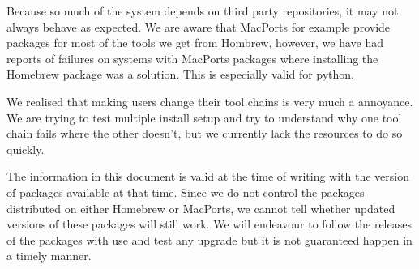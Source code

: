 \documentclass{scrartcl}
\begin{document}
Because so much of the system depends on third party repositories, it may not
always behave as expected. We are aware that MacPorts for example provide
packages for most of the tools we get from Hombrew, however, we have had
reports of failures on systems with MacPorts packages where installing the
Homebrew package was a solution. This is especially valid for python.

We realised that making users change their tool chains is very much a
annoyance. We are trying to test multiple install setup and try to understand
why one tool chain fails where the other doesn't, but we currently lack the
resources to do so quickly.

The information in this document is valid at the time of writing with the
version of packages available at that time. Since we do not control the
packages distributed on either Homebrew or MacPorts, we cannot tell whether
updated versions of these packages will still work. We will endeavour to follow
the releases of the packages with use and test any upgrade but it is not
guaranteed happen in a timely manner.
\end{document}
